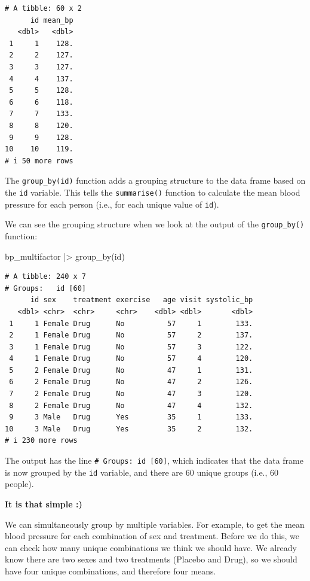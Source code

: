 \documentclass[
  letterpaper,
  8pt,
  a4paper]{book}
\newenvironment{Shaded}{\begin{snugshade}}{\end{snugshade}}
\newcommand{\FunctionTok}[1]{\textcolor[rgb]{0.28,0.35,0.67}{#1}}
\newcommand{\NormalTok}[1]{\textcolor[rgb]{0.00,0.23,0.31}{#1}}
\newcommand{\SpecialCharTok}[1]{\textcolor[rgb]{0.37,0.37,0.37}{#1}}
\begin{document}
\begin{verbatim}
# A tibble: 60 x 2
      id mean_bp
   <dbl>   <dbl>
 1     1    128.
 2     2    127.
 3     3    127.
 4     4    137.
 5     5    128.
 6     6    118.
 7     7    133.
 8     8    120.
 9     9    128.
10    10    119.
# i 50 more rows
\end{verbatim}

The \texttt{group\_by(id)} function adds a grouping structure to the
data frame based on the \texttt{id} variable. This tells the
\texttt{summarise()} function to calculate the mean blood pressure for
each person (i.e., for each unique value of \texttt{id}).

We can see the grouping structure when we look at the output of the
\texttt{group\_by()} function:

\begin{Shaded}
\begin{Highlighting}[]
\NormalTok{bp\_multifactor }\SpecialCharTok{|\textgreater{}}
  \FunctionTok{group\_by}\NormalTok{(id)}
\end{Highlighting}
\end{Shaded}

\begin{verbatim}
# A tibble: 240 x 7
# Groups:   id [60]
      id sex    treatment exercise   age visit systolic_bp
   <dbl> <chr>  <chr>     <chr>    <dbl> <dbl>       <dbl>
 1     1 Female Drug      No          57     1        133.
 2     1 Female Drug      No          57     2        137.
 3     1 Female Drug      No          57     3        122.
 4     1 Female Drug      No          57     4        120.
 5     2 Female Drug      No          47     1        131.
 6     2 Female Drug      No          47     2        126.
 7     2 Female Drug      No          47     3        120.
 8     2 Female Drug      No          47     4        132.
 9     3 Male   Drug      Yes         35     1        133.
10     3 Male   Drug      Yes         35     2        132.
# i 230 more rows
\end{verbatim}

The output has the line \texttt{\#\ Groups:\ id\ {[}60{]}}, which
indicates that the data frame is now grouped by the \texttt{id}
variable, and there are 60 unique groups (i.e., 60 people).

\textbf{It is that simple :)}

We can simultaneously group by multiple variables. For example, to get
the mean blood pressure for each combination of sex and treatment.
Before we do this, we can check how many unique combinations we think we
should have. We already know there are two sexes and two treatments
(Placebo and Drug), so we should have four unique combinations, and
therefore four means.
\end{document}
